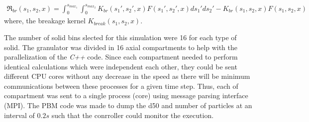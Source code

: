 \documentclass[fleqn,twoside,10pt]{article}
\begin{document}
\begin{align}
\Re_{br}(s_1,s_2,x) = \int_0^{s_{max_1}} \int_0^{s_{max_2}} 
K_{br}(s_1',s_2',x)F(s_1',s_2',x)ds_1'ds_2' - K_{br}(s_1,s_2,x)F(s_1,s_2,x)
\label{eqn:PBM_break_cons}
\end{align}
where, the breakage kernel $K_{break}(s_1,s_2,x)$. 

The number of solid bins slected for this simulation were 16 for each type of solid. The granulator was 
divided in 16 axial compartments to help with the parallelization of the \textit{C++} code. Since each 
compartment needed to perform identical calculations which were independent each other, they could 
be sent different CPU cores without any decrease in the speed as there will be minimum communications 
between these processes for a given time step. Thus, each of compartment was sent to a single process 
(core) using message parsing interface (MPI). The PBM code was made to dump the d50 and number of 
particles at an interval of $0.2s$ such that the conrroller could monitor the execution. 

%
%


\end{document}
